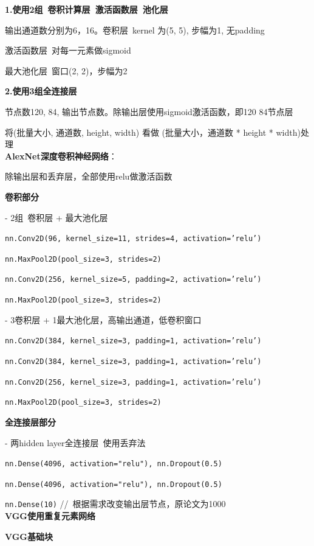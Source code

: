 \documentclass[UTF8]{ctexart}
\begin{document}
  \textbf{1.使用2组\ 卷积计算层\ 激活函数层\ 池化层}

  \quad 输出通道数分别为6，16。卷积层\ kernel 为(5, 5), 步幅为1, 无padding

  \quad 激活函数层\ 对每一元素做sigmoid

  \quad 最大池化层\ 窗口(2, 2)，步幅为2

  \textbf{2.使用3组全连接层}

  \quad 节点数120, 84, 输出节点数。除输出层使用sigmoid激活函数，即120 84节点层

  \quad 将(批量大小, 通道数, height, width) 看做 (批量大小，通道数 * height * width)处理\\
\textbf{AlexNet深度卷积神经网络}：

  除输出层和丢弃层，全部使用relu做激活函数

  \textbf{卷积部分}
  
  \quad - 2组\ 卷积层 + 最大池化层
  
  \quad \texttt{nn.Conv2D(96, kernel\_size=11, strides=4, activation='relu')}

  \quad \texttt{nn.MaxPool2D(pool\_size=3, strides=2)}

  \quad \texttt{nn.Conv2D(256, kernel\_size=5, padding=2, activation='relu')}

  \quad \texttt{nn.MaxPool2D(pool\_size=3, strides=2)}
  
  \quad - 3卷积层 + 1最大池化层，高输出通道，低卷积窗口
  
  \quad \texttt{nn.Conv2D(384, kernel\_size=3, padding=1, activation='relu')}
  
  \quad \texttt{nn.Conv2D(384, kernel\_size=3, padding=1, activation='relu')} 
  
  \quad \texttt{nn.Conv2D(256, kernel\_size=3, padding=1, activation='relu')}
  
  \quad \texttt{nn.MaxPool2D(pool\_size=3, strides=2)}

  \textbf{全连接层部分}
  
  \quad - 两hidden layer全连接层\ 使用丢弃法

  \quad \texttt{nn.Dense(4096, activation="relu"), nn.Dropout(0.5)}
  
  \quad \texttt{nn.Dense(4096, activation="relu"), nn.Dropout(0.5)}
  
  \quad \texttt{nn.Dense(10)} //\ 根据需求改变输出层节点，原论文为1000\\
\textbf{VGG使用重复元素网络}

  \textbf{VGG基础块}
\end{document}

